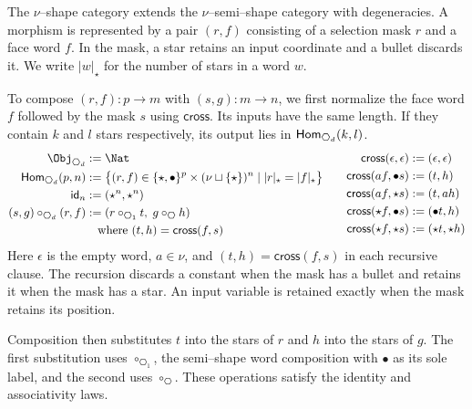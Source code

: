 \documentclass[a4paper,UKenglish,cleveref,autoref]{lipics-v2021}
\newcommand{\kstar}{{\star}}
\begin{document}
\begin{definition}[$\hexagon_d$]
  The $\nu$--shape category extends the $\nu$--semi--shape category with degeneracies. A morphism is represented by a pair $(r,f)$ consisting of a selection mask $r$ and a face word $f$. In the mask, a star retains an input coordinate and a bullet discards it. We write $|w|_{\kstar}$ for the number of stars in a word $w$.

  To compose $(r,f):p\to m$ with $(s,g):m\to n$, we first normalize the face word $f$ followed by the mask $s$ using $\mathsf{cross}$. Its inputs have the same length. If they contain $k$ and $l$ stars respectively, its output lies in $\Hom_{\hexagon_d}(k,l)$.
  \[
    \begin{aligned}[t]
      \Obj_{\hexagon_d} &:= \Nat \\
      \Hom_{\hexagon_d}(p,n)
        &:= \bigl\{(r,f)\in\{\kstar,\bullet\}^p\times(\nu\sqcup\{\kstar\})^n\mid |r|_{\kstar}=|f|_{\kstar}\bigr\} \\
      \id_n &:= (\kstar^n,\kstar^n) \\
      (s,g)\circ_{\hexagon_d}(r,f)
        &:= (r\circ_{\hexagon_1}t,\;g\circ_{\hexagon}h) \\
        &\quad\text{where }(t,h)=\mathsf{cross}(f,s)
    \end{aligned}
    \qquad
    \begin{aligned}[t]
      \mathsf{cross}(\epsilon,\epsilon)  &:= (\epsilon,\epsilon) \\
      \mathsf{cross}(a f,\bullet s)      &:= (t,h)               \\
      \mathsf{cross}(a f,\kstar s)       &:= (t,a h)             \\
      \mathsf{cross}(\kstar f,\bullet s) &:= (\bullet t,h)       \\
      \mathsf{cross}(\kstar f,\kstar s)  &:= (\kstar t,\kstar h)
    \end{aligned}
  \]
  Here $\epsilon$ is the empty word, $a\in\nu$, and $(t,h)=\mathsf{cross}(f,s)$ in each recursive clause. The recursion discards a constant when the mask has a bullet and retains it when the mask has a star. An input variable is retained exactly when the mask retains its position.

  Composition then substitutes $t$ into the stars of $r$ and $h$ into the stars of $g$. The first substitution uses $\circ_{\hexagon_1}$, the semi--shape word composition with $\bullet$ as its sole label, and the second uses $\circ_{\hexagon}$. These operations satisfy the identity and associativity laws.
\end{definition}
\end{document}
